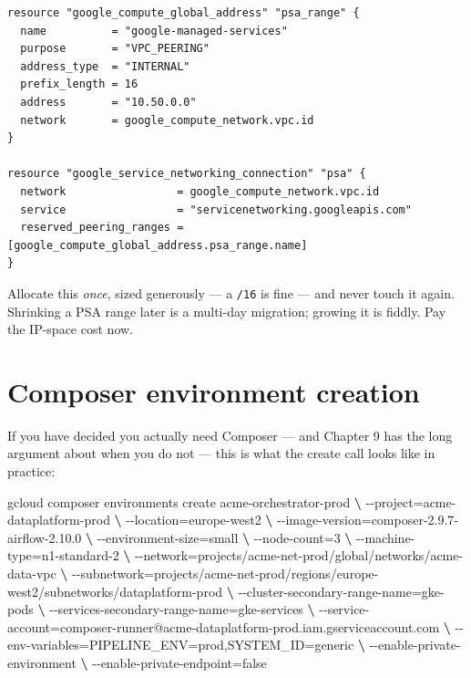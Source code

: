 \documentclass[
  11pt,
  british,
  oneside]{book}
\newenvironment{Shaded}{\begin{snugshade}}{\end{snugshade}}
\newcommand{\ExtensionTok}[1]{#1}
\newcommand{\KeywordTok}[1]{\textcolor[rgb]{0.13,0.29,0.53}{\textbf{#1}}}
\newcommand{\NormalTok}[1]{#1}
\begin{document}
\begin{verbatim}
resource "google_compute_global_address" "psa_range" {
  name          = "google-managed-services"
  purpose       = "VPC_PEERING"
  address_type  = "INTERNAL"
  prefix_length = 16
  address       = "10.50.0.0"
  network       = google_compute_network.vpc.id
}

resource "google_service_networking_connection" "psa" {
  network                 = google_compute_network.vpc.id
  service                 = "servicenetworking.googleapis.com"
  reserved_peering_ranges = [google_compute_global_address.psa_range.name]
}
\end{verbatim}

Allocate this \emph{once}, sized generously --- a \texttt{/16} is fine
--- and never touch it again. Shrinking a PSA range later is a multi-day
migration; growing it is fiddly. Pay the IP-space cost now.

\hypertarget{composer-environment-creation}{%
\section{Composer environment
creation}\label{composer-environment-creation}}

If you have decided you actually need Composer --- and Chapter 9 has the
long argument about when you do not --- this is what the create call
looks like in practice:

\begin{Shaded}
\begin{Highlighting}[]
\ExtensionTok{gcloud}\NormalTok{ composer environments create acme{-}orchestrator{-}prod }\KeywordTok{\textbackslash{}}
  \ExtensionTok{{-}{-}project}\NormalTok{=acme{-}dataplatform{-}prod }\KeywordTok{\textbackslash{}}
  \ExtensionTok{{-}{-}location}\NormalTok{=europe{-}west2 }\KeywordTok{\textbackslash{}}
  \ExtensionTok{{-}{-}image{-}version}\NormalTok{=composer{-}2.9.7{-}airflow{-}2.10.0 }\KeywordTok{\textbackslash{}}
  \ExtensionTok{{-}{-}environment{-}size}\NormalTok{=small }\KeywordTok{\textbackslash{}}
  \ExtensionTok{{-}{-}node{-}count}\NormalTok{=3 }\KeywordTok{\textbackslash{}}
  \ExtensionTok{{-}{-}machine{-}type}\NormalTok{=n1{-}standard{-}2 }\KeywordTok{\textbackslash{}}
  \ExtensionTok{{-}{-}network}\NormalTok{=projects/acme{-}net{-}prod/global/networks/acme{-}data{-}vpc }\KeywordTok{\textbackslash{}}
  \ExtensionTok{{-}{-}subnetwork}\NormalTok{=projects/acme{-}net{-}prod/regions/europe{-}west2/subnetworks/dataplatform{-}prod }\KeywordTok{\textbackslash{}}
  \ExtensionTok{{-}{-}cluster{-}secondary{-}range{-}name}\NormalTok{=gke{-}pods }\KeywordTok{\textbackslash{}}
  \ExtensionTok{{-}{-}services{-}secondary{-}range{-}name}\NormalTok{=gke{-}services }\KeywordTok{\textbackslash{}}
  \ExtensionTok{{-}{-}service{-}account}\NormalTok{=composer{-}runner@acme{-}dataplatform{-}prod.iam.gserviceaccount.com }\KeywordTok{\textbackslash{}}
  \ExtensionTok{{-}{-}env{-}variables}\NormalTok{=PIPELINE\_ENV=prod,SYSTEM\_ID=generic }\KeywordTok{\textbackslash{}}
  \ExtensionTok{{-}{-}enable{-}private{-}environment} \KeywordTok{\textbackslash{}}
  \ExtensionTok{{-}{-}enable{-}private{-}endpoint}\NormalTok{=false}
\end{Highlighting}
\end{Shaded}
\end{document}
